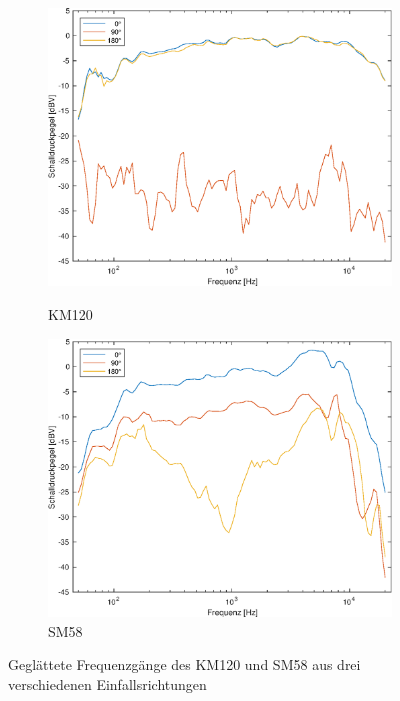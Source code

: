 \begin{figure}[bth]
    \centering
    \begin{subfigure}{.5\textwidth}
        \centering
        \caption{KM120}
        \includegraphics[width=0.95\linewidth]{Figures/km120_all}
        \label{fig:km_sm}
    \end{subfigure}%
    \begin{subfigure}{.5\textwidth}
        \centering
        \caption{SM58}
        \includegraphics[width=0.95\linewidth]{Figures/sm58_all.eps}
    \end{subfigure}
    \caption{Geglättete Frequenzgänge  des KM120 und SM58 aus drei verschiedenen Einfallsrichtungen}
    \label{fig:freq_all}
\end{figure}


